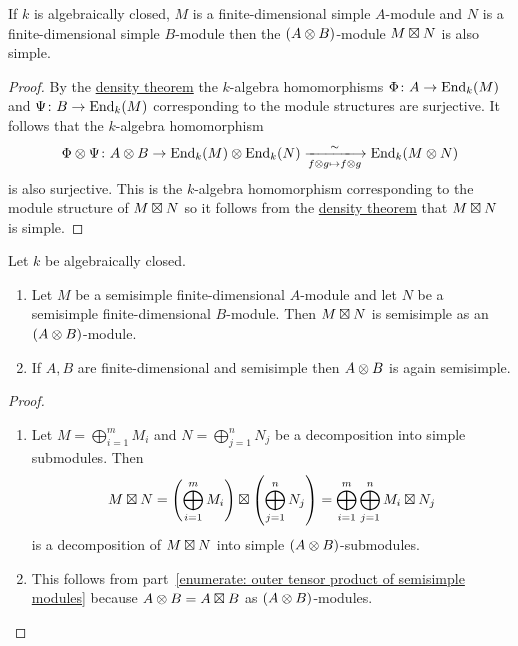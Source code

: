 \begin{lemma}
  \label{lemma: tensor product of modules is again simple}
  If $k$ is algebraically closed, $M$ is a finite-dimensional simple $A$-module and $N$ is a finite-dimensional simple $B$-module then the $(A \mathbin{\otimes} B)$-module $M \mathbin{\boxtimes} N$ is also simple.
\end{lemma}


\begin{proof}
  By the \hyperref[theorem: density theorem]{density theorem} the $k$-algebra homomorphisms $\Phi \colon A \to \operatorname{End}_k(M)$ and $\Psi \colon B \to \operatorname{End}_k(M)$ corresponding to the module structures are surjective.
  It follows that the $k$-algebra homomorphism
  \[
            \Phi \tensor \Psi
    \colon  A \tensor B
    \to     \End_k(M) \tensor \End_k(N)
    \xlongrightarrow[f \tensor g \mapsto f \tensor g]{\sim} 
            \End_k(M \tensor N)
  \]
  is also surjective.
  This is the $k$-algebra homomorphism corresponding to the module structure of $M \mathbin{\boxtimes} N$ so it follows from the \hyperref[theorem: density theorem]{density theorem} that $M \mathbin{\boxtimes} N$ is simple.
\end{proof}




\begin{corollary}
  Let $k$ be algebraically closed.
  \begin{enumerate}
    \item
      \label{enumerate: outer tensor product of semisimple modules}
      Let $M$ be a semisimple finite-dimensional $A$-module and let $N$ be a semisimple finite-dimensional $B$-module.
      Then $M \mathbin{\boxtimes} N$ is semisimple as an $(A \mathbin{\otimes} B)$-module.
    \item
      If $A, B$ are finite-dimensional and semisimple then $A \mathbin{\otimes} B$ is again semisimple.
  \end{enumerate}
\end{corollary}


\begin{proof}
  \leavevmode
  \begin{enumerate}
    \item
      Let $M = \bigoplus_{i=1}^m M_i$ and $N = \bigoplus_{j=1}^n N_j$ be a decomposition into simple submodules.
      Then
      \[
          M \mathbin{\boxtimes} N
        = \left( \bigoplus_{i=1}^m M_i \right) \mathbin{\boxtimes} \left( \bigoplus_{j=1}^n N_j \right)
        = \bigoplus_{i=1}^m \bigoplus_{j=1}^n M_i \mathbin{\boxtimes} N_j
      \]
      is a decomposition of $M \mathbin{\boxtimes} N$ into simple $(A \mathbin{\otimes} B)$-submodules.
    \item
      This follows from part~\ref*{enumerate: outer tensor product of semisimple modules} because $A \mathbin{\otimes} B = A \mathbin{\boxtimes} B$ as $(A \mathbin{\otimes} B)$-modules.
    \qedhere
  \end{enumerate}
\end{proof}


